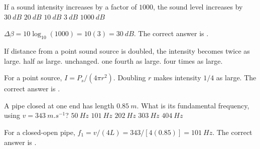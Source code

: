 \documentclass[full,print,11pt,a4paper]{physicsquiz}
\begin{document}
\begin{quizbank}
  \begin{quizquestion}[
    id=ow-sound-022,
    topic=sound-intensity,
    difficulty=applied,
    marks=1,
    correct=A,
    tags={intensity,decibels},
    outcome={Convert intensity ratio to sound-level change}
  ]
    If a sound intensity increases by a factor of \(1000\), the sound level
    increases by
    \choices
      {\(\SI{30}{dB}\)}
      {\(\SI{20}{dB}\)}
      {\(\SI{10}{dB}\)}
      {\(\SI{3}{dB}\)}
      {\(\SI{1000}{dB}\)}
  \end{quizquestion}
  \begin{quizsolution}
    \(\Delta\beta=10\log_{10}(1000)=10(3)=\SI{30}{dB}\). The correct answer is
    \quizcorrectletter.
  \end{quizsolution}

  \begin{quizquestion}[
    id=ow-sound-023,
    topic=sound-intensity,
    difficulty=foundation,
    marks=1,
    correct=D,
    tags={inverse-square},
    outcome={Apply inverse-square spreading for a point sound source}
  ]
    If distance from a point sound source is doubled, the intensity becomes
    \choices
      {twice as large.}
      {half as large.}
      {unchanged.}
      {one fourth as large.}
      {four times as large.}
  \end{quizquestion}
  \begin{quizsolution}
    For a point source, \(I=P_s/(4\pi r^2)\). Doubling \(r\) makes intensity
    \(1/4\) as large. The correct answer is \quizcorrectletter.
  \end{quizsolution}

  \begin{quizquestion}[
    id=ow-pipe-024,
    topic=sound-pipes,
    difficulty=applied,
    marks=1,
    correct=B,
    tags={closed-pipe,harmonics},
    outcome={Compute closed-open pipe resonance}
  ]
    A pipe closed at one end has length \(\SI{0.85}{m}\). What is its
    fundamental frequency, using \(v=\SI{343}{m.s^{-1}}\)?
    \choices
      {\(\SI{50}{Hz}\)}
      {\(\SI{101}{Hz}\)}
      {\(\SI{202}{Hz}\)}
      {\(\SI{303}{Hz}\)}
      {\(\SI{404}{Hz}\)}
  \end{quizquestion}
  \begin{quizsolution}
    For a closed-open pipe, \(f_1=v/(4L)=343/[4(0.85)]=\SI{101}{Hz}\). The
    correct answer is \quizcorrectletter.
  \end{quizsolution}


\end{quizbank}
\end{document}
